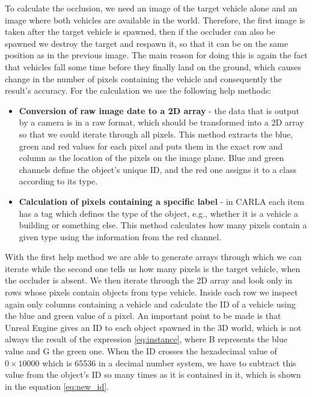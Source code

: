  To calculate the occlusion, we need an image of the target vehicle alone and an image where both vehicles are available in the world. Therefore, the first image is taken after the target vehicle is spawned, then if the occluder can also be spawned we destroy the target and respawn it, so that it can be on the same position as in the previous image. The main reason for doing this is again the fact that vehicles fall some time before they finally land on the ground, which causes change in the number of pixels containing the vehicle and consequently the result's accuracy. For the calculation we use the following help methods:
 \begin{itemize}
     \item \textbf{Conversion of raw image date to a 2D array} - the data that is output by a camera is in a raw format, which should be transformed into a 2D array so that we could iterate through all pixels. This method extracts the blue, green and red values for each pixel and puts them in the exact row and column as the location of the pixels on the image plane. Blue and green channels define the object's unique ID, and the red one assigns it to a class according to its type.
     \item \textbf{Calculation of pixels containing a specific label} - in CARLA each item has a tag which defines the type of the object, e.g., whether it is a vehicle a building or something else. This method calculates how many pixels contain a given type using the information from the red channel. 
 \end{itemize}

With the first help method we are able to generate arrays through which we can iterate while the second one tells us how many pixels is the target vehicle, when the occluder is absent. We then iterate through the 2D array and look only in rows whose pixels contain objects from type vehicle. Inside each row we inspect again only columns containing a vehicle and calculate the ID of a vehicle using the blue and green value of a pixel. An important point to be made is that Unreal Engine gives an ID to each object spawned in the 3D world, which is not always the result of the expression \ref{eq:instance}, where B represents the blue value and G the green one.
When the ID crosses the hexadecimal value of $0\times10000$ which is 65536 in a decimal number system, we have to subtract this value from the object's ID so many times as it is contained in it, which is shown in the equation \ref{eq:new_id}.

